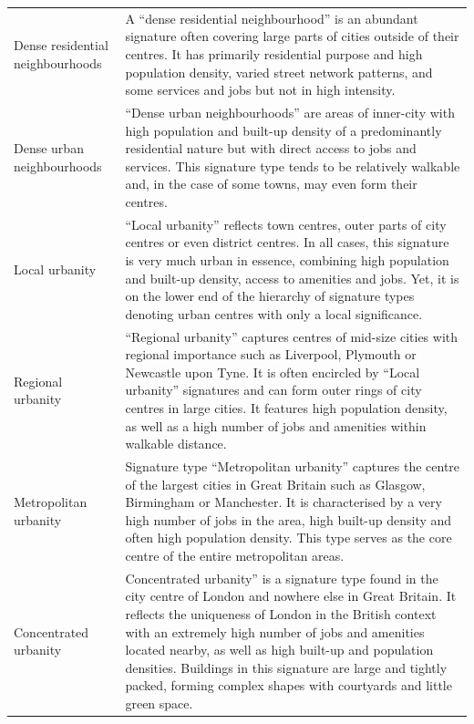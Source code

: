 \documentclass[fleqn,10pt]{wlscirep}
\begin{document}
\begin{longtable}{p{}p{}}
    Dense residential neighbourhoods     &                                                                                                                                           A “dense residential neighbourhood” is an abundant signature often covering large parts of cities outside of their centres. It has primarily residential purpose and high population density, varied street network patterns, and some services and jobs but not in high intensity. \\
    Dense urban neighbourhoods           &                                                                                                                            “Dense urban neighbourhoods” are areas of inner-city with high population and built-up density of a predominantly residential nature but with direct access to jobs and services. This signature type tends to be relatively walkable and, in the case of some towns, may even form their centres. \\
    Local urbanity                       &                                                                “Local urbanity” reflects town centres, outer parts of city centres or even district centres. In all cases, this signature is very much urban in essence, combining high population and built-up density, access to amenities and jobs. Yet, it is on the lower end of the hierarchy of signature types denoting urban centres with only a local significance. \\
    Regional urbanity                    &                                                             “Regional urbanity” captures centres of mid-size cities with regional importance such as Liverpool, Plymouth or Newcastle upon Tyne. It is often encircled by “Local urbanity” signatures and can form outer rings of city centres in large cities. It features high population density, as well as a high number of jobs and amenities within walkable distance. \\
    Metropolitan urbanity                &                                                                                    Signature type “Metropolitan urbanity” captures the centre of the largest cities in Great Britain such as Glasgow, Birmingham or Manchester. It is characterised by a very high number of jobs in the area, high built-up density and often high population density. This type serves as the core centre of the entire metropolitan areas. \\
    Concentrated urbanity                &  Concentrated urbanity” is a signature type found in the city centre of London and nowhere else in Great Britain. It reflects the uniqueness of London in the British context with an extremely high number of jobs and amenities located nearby, as well as high built-up and population densities. Buildings in this signature are large and tightly packed, forming complex shapes with courtyards and little green space. \\

\end{longtable}
\end{document}
